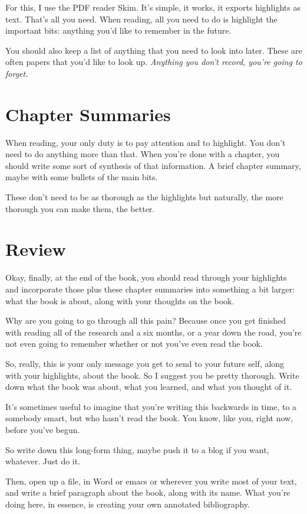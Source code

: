 For this, I use the PDF reader Skim. It's simple, it works, it exports
highlights as text. That's all you need. When reading, all you need to do is
highlight the important bits: anything you'd like to remember in the future.

You should also keep a list of anything that you need to look into later. These are
often papers that you'd like to look up. \textit{Anything you don't record,
  you're going to forget.}

\section{Chapter Summaries}

When reading, your only duty is to pay attention and to highlight. You don't
need to do anything more than that. When you're done with a chapter, you should
write some sort of synthesis of that information. A brief chapter summary, maybe
with some bullets of the main bits.

These don't need to be as thorough as the highlights but naturally, the more
thorough you can make them, the better.

\section{Review}

Okay, finally, at the end of the book, you should read through your highlights
and incorporate those plus these chapter
summaries into something a bit larger: what the book is about, along with your
thoughts on the book.

Why are you going to go through all this pain? Because once you get finished
with reading all of the research and a six months, or a year down the road,
you're not even going to remember whether or not you've even read the book.

So, really, this is your only message you get to send to your future self, along
with your highlights, about the book. So I suggest you be pretty
thorough. Write down what the book was about, what you learned, and what you
thought of it.

It's sometimes useful to imagine that you're writing this backwards in time, to
a somebody smart, but who hasn't read the book. You know, like you, right now,
before you've begun.

So write down this long-form thing, maybe push it to a blog if you want,
whatever. Just do it.

Then, open up a file, in Word or emacs or wherever you write most of your text,
and write a brief paragraph about the book, along with its name. What you're
doing here, in essence, is creating your own annotated bibliography.

